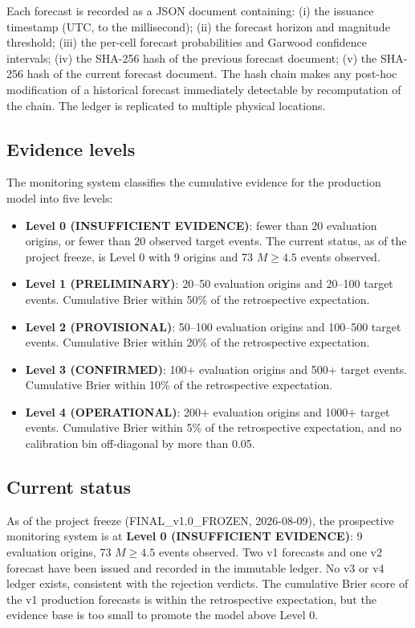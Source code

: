 \documentclass[10pt,a4paper,twocolumn]{article}
\begin{document}
Each forecast is recorded as a JSON document containing: (i) the issuance timestamp (UTC, to the millisecond); (ii) the forecast horizon and magnitude threshold; (iii) the per-cell forecast probabilities and Garwood confidence intervals; (iv) the SHA-256 hash of the previous forecast document; (v) the SHA-256 hash of the current forecast document. The hash chain makes any post-hoc modification of a historical forecast immediately detectable by recomputation of the chain. The ledger is replicated to multiple physical locations.

\subsection{Evidence levels}

The monitoring system classifies the cumulative evidence for the production model into five levels:

\begin{itemize}[leftmargin=1.2em,itemsep=2pt,topsep=2pt]
\item \textbf{Level 0 (INSUFFICIENT EVIDENCE)}: fewer than 20 evaluation origins, or fewer than 20 observed target events. The current status, as of the project freeze, is Level 0 with 9 origins and 73 $M\geq4.5$ events observed.
\item \textbf{Level 1 (PRELIMINARY)}: 20--50 evaluation origins and 20--100 target events. Cumulative Brier within 50\% of the retrospective expectation.
\item \textbf{Level 2 (PROVISIONAL)}: 50--100 evaluation origins and 100--500 target events. Cumulative Brier within 20\% of the retrospective expectation.
\item \textbf{Level 3 (CONFIRMED)}: 100+ evaluation origins and 500+ target events. Cumulative Brier within 10\% of the retrospective expectation.
\item \textbf{Level 4 (OPERATIONAL)}: 200+ evaluation origins and 1000+ target events. Cumulative Brier within 5\% of the retrospective expectation, and no calibration bin off-diagonal by more than 0.05.
\end{itemize}

\subsection{Current status}

As of the project freeze (FINAL\_v1.0\_FROZEN, 2026-08-09), the prospective monitoring system is at \textbf{Level 0 (INSUFFICIENT EVIDENCE)}: 9 evaluation origins, 73 $M\geq4.5$ events observed. Two v1 forecasts and one v2 forecast have been issued and recorded in the immutable ledger. No v3 or v4 ledger exists, consistent with the rejection verdicts. The cumulative Brier score of the v1 production forecasts is within the retrospective expectation, but the evidence base is too small to promote the model above Level 0.
\end{document}
